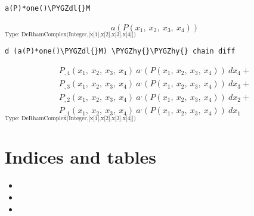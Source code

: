 \documentclass[letterpaper,10pt,english]{sphinxmanual}
\def\PYGZdl{\char`\$}
\def\PYGZhy{\char`\-}
\begin{document}
\begin{Verbatim}[commandchars=\\\{\}]
a(P)*one()\PYGZdl{}M
\end{Verbatim}
\begin{equation*}
\begin{split}a
\left(
{{P
\left(
{{x _ {1}}, \: {x _ {2}}, \: {x _ {3}}, \: {x _ {4}}}
\right)}}
\right)\end{split}
\end{equation*}
$_{\text{Type: DeRhamComplex(Integer,{[}x{[}1{]},x{[}2{]},x{[}3{]},x{[}4{]}{]})}}$

\begin{Verbatim}[commandchars=\\\{\}]
d (a(P)*one()\PYGZdl{}M) \PYGZhy{}\PYGZhy{} chain diff
\end{Verbatim}
\begin{equation*}
\begin{split}{{{P _ {{,4}}}
\left(
{{x _ {1}}, \: {x _ {2}}, \: {x _ {3}}, \: {x _ {4}}}
\right)}
\  {{a _ {{\ }} ^ {,}}
\left(
{{P
\left(
{{x _ {1}}, \: {x _ {2}}, \: {x _ {3}}, \: {x _ {4}}}
\right)}}
\right)}
\  {dx _ {4}}}+ \\ {{{P _ {{,3}}}
\left(
{{x _ {1}}, \: {x _ {2}}, \: {x _ {3}}, \: {x _ {4}}}
\right)}
\  {{a _ {{\ }} ^ {,}}
\left(
{{P
\left(
{{x _ {1}}, \: {x _ {2}}, \: {x _ {3}}, \: {x _ {4}}}
\right)}}
\right)}
\  {dx _ {3}}}+ \\ {{{P _ {{,2}}}
\left(
{{x _ {1}}, \: {x _ {2}}, \: {x _ {3}}, \: {x _ {4}}}
\right)}
\  {{a _ {{\ }} ^ {,}}
\left(
{{P
\left(
{{x _ {1}}, \: {x _ {2}}, \: {x _ {3}}, \: {x _ {4}}}
\right)}}
\right)}
\  {dx _ {2}}}+ \\ {{{P _ {{,1}}}
\left(
{{x _ {1}}, \: {x _ {2}}, \: {x _ {3}}, \: {x _ {4}}}
\right)}
\  {{a _ {{\ }} ^ {,}}
\left(
{{P
\left(
{{x _ {1}}, \: {x _ {2}}, \: {x _ {3}}, \: {x _ {4}}}
\right)}}
\right)}
\  {dx _ {1}}}\end{split}
\end{equation*}
$_{\text{Type: DeRhamComplex(Integer,{[}x{[}1{]},x{[}2{]},x{[}3{]},x{[}4{]}{]})}}$


\chapter{Indices and tables}
\label{index:indices-and-tables}\begin{itemize}
\item {} 

\item {} 

\item {} 

\end{itemize}



\renewcommand{\indexname}{Index}
\printindex
\end{document}
